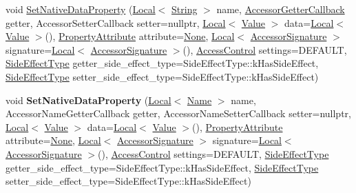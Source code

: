 \begin{DoxyCompactItemize}
\item 
void \mbox{\hyperlink{classv8_1_1Template_a771f6ca09e5c4789306f8638de5b99ed}{Set\+Native\+Data\+Property}} (\mbox{\hyperlink{classv8_1_1Local}{Local}}$<$ \mbox{\hyperlink{classv8_1_1String}{String}} $>$ name, \mbox{\hyperlink{namespacev8_a722613c87061708a4f1aa050d095f868}{Accessor\+Getter\+Callback}} getter, Accessor\+Setter\+Callback setter=nullptr, \mbox{\hyperlink{classv8_1_1Local}{Local}}$<$ \mbox{\hyperlink{classv8_1_1Value}{Value}} $>$ data=\mbox{\hyperlink{classv8_1_1Local}{Local}}$<$ \mbox{\hyperlink{classv8_1_1Value}{Value}} $>$(), \mbox{\hyperlink{namespacev8_a05f25f935e108a1ea2d150e274602b87}{Property\+Attribute}} attribute=\mbox{\hyperlink{namespacev8_a05f25f935e108a1ea2d150e274602b87a7ab4d58719c33b3ea2dfaefa29b111df}{None}}, \mbox{\hyperlink{classv8_1_1Local}{Local}}$<$ \mbox{\hyperlink{classv8_1_1AccessorSignature}{Accessor\+Signature}} $>$ signature=\mbox{\hyperlink{classv8_1_1Local}{Local}}$<$ \mbox{\hyperlink{classv8_1_1AccessorSignature}{Accessor\+Signature}} $>$(), \mbox{\hyperlink{namespacev8_a31d8355cb043d7d2dda3f4a52760b64e}{Access\+Control}} settings=D\+E\+F\+A\+U\+LT, \mbox{\hyperlink{namespacev8_a29711319c2b9fc7716d65faee2f7b9cb}{Side\+Effect\+Type}} getter\+\_\+side\+\_\+effect\+\_\+type=Side\+Effect\+Type\+::k\+Has\+Side\+Effect, \mbox{\hyperlink{namespacev8_a29711319c2b9fc7716d65faee2f7b9cb}{Side\+Effect\+Type}} setter\+\_\+side\+\_\+effect\+\_\+type=Side\+Effect\+Type\+::k\+Has\+Side\+Effect)
\item 
\mbox{\label{classv8_1_1Template_ae547de668df4ca1c90a637effd86dad8}} 
void {\bfseries Set\+Native\+Data\+Property} (\mbox{\hyperlink{classv8_1_1Local}{Local}}$<$ \mbox{\hyperlink{classv8_1_1Name}{Name}} $>$ name, Accessor\+Name\+Getter\+Callback getter, Accessor\+Name\+Setter\+Callback setter=nullptr, \mbox{\hyperlink{classv8_1_1Local}{Local}}$<$ \mbox{\hyperlink{classv8_1_1Value}{Value}} $>$ data=\mbox{\hyperlink{classv8_1_1Local}{Local}}$<$ \mbox{\hyperlink{classv8_1_1Value}{Value}} $>$(), \mbox{\hyperlink{namespacev8_a05f25f935e108a1ea2d150e274602b87}{Property\+Attribute}} attribute=\mbox{\hyperlink{namespacev8_a05f25f935e108a1ea2d150e274602b87a7ab4d58719c33b3ea2dfaefa29b111df}{None}}, \mbox{\hyperlink{classv8_1_1Local}{Local}}$<$ \mbox{\hyperlink{classv8_1_1AccessorSignature}{Accessor\+Signature}} $>$ signature=\mbox{\hyperlink{classv8_1_1Local}{Local}}$<$ \mbox{\hyperlink{classv8_1_1AccessorSignature}{Accessor\+Signature}} $>$(), \mbox{\hyperlink{namespacev8_a31d8355cb043d7d2dda3f4a52760b64e}{Access\+Control}} settings=D\+E\+F\+A\+U\+LT, \mbox{\hyperlink{namespacev8_a29711319c2b9fc7716d65faee2f7b9cb}{Side\+Effect\+Type}} getter\+\_\+side\+\_\+effect\+\_\+type=Side\+Effect\+Type\+::k\+Has\+Side\+Effect, \mbox{\hyperlink{namespacev8_a29711319c2b9fc7716d65faee2f7b9cb}{Side\+Effect\+Type}} setter\+\_\+side\+\_\+effect\+\_\+type=Side\+Effect\+Type\+::k\+Has\+Side\+Effect)

\end{DoxyCompactItemize}
